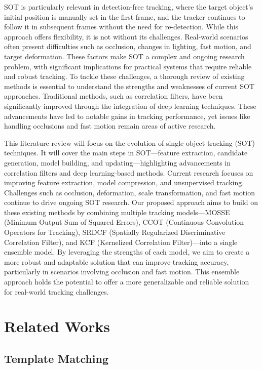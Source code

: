 \documentclass{article}
\begin{document}
SOT is particularly relevant in detection-free tracking, where the target object's initial position is manually set in the first frame, and the tracker continues to follow it in subsequent frames without the need for re-detection. While this approach offers flexibility, it is not without its challenges. Real-world scenarios often present difficulties such as occlusion, changes in lighting, fast motion, and target deformation. These factors make SOT a complex and ongoing research problem, with significant implications for practical systems that require reliable and robust tracking.
To tackle these challenges, a thorough review of existing methods is essential to understand the strengths and weaknesses of current SOT approaches. Traditional methods, such as correlation filters, have been significantly improved through the integration of deep learning techniques. These advancements have led to notable gains in tracking performance, yet issues like handling occlusions and fast motion remain areas of active research.

This literature review will focus on the evolution of single object tracking (SOT) techniques. It will cover the main steps in SOT—feature extraction, candidate generation, model building, and updating—highlighting advancements in correlation filters and deep learning-based methods. Current research focuses on improving feature extraction, model compression, and unsupervised tracking. Challenges such as occlusion, deformation, scale transformation, and fast motion continue to drive ongoing SOT research.
Our proposed approach aims to build on these existing methods by combining multiple tracking models—MOSSE (Minimum Output Sum of Squared Errors), CCOT (Continuous Convolution Operators for Tracking), SRDCF (Spatially Regularized Discriminative Correlation Filter), and KCF (Kernelized Correlation Filter)—into a single ensemble model. By leveraging the strengths of each model, we aim to create a more robust and adaptable solution that can improve tracking accuracy, particularly in scenarios involving occlusion and fast motion. This ensemble approach holds the potential to offer a more generalizable and reliable solution for real-world tracking challenges.

\section{Related Works}
\subsection{Template Matching}
\end{document}

